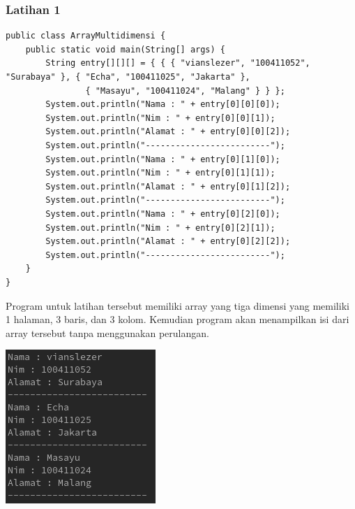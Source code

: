 \documentclass[a4paper,12pt]{article}
\begin{document}
\subsubsection{Latihan 1}
\begin{lstlisting}
public class ArrayMultidimensi {
    public static void main(String[] args) {
        String entry[][][] = { { { "vianslezer", "100411052", "Surabaya" }, { "Echa", "100411025", "Jakarta" },
                { "Masayu", "100411024", "Malang" } } };
        System.out.println("Nama : " + entry[0][0][0]);
        System.out.println("Nim : " + entry[0][0][1]);
        System.out.println("Alamat : " + entry[0][0][2]);
        System.out.println("-------------------------");
        System.out.println("Nama : " + entry[0][1][0]);
        System.out.println("Nim : " + entry[0][1][1]);
        System.out.println("Alamat : " + entry[0][1][2]);
        System.out.println("-------------------------");
        System.out.println("Nama : " + entry[0][2][0]);
        System.out.println("Nim : " + entry[0][2][1]);
        System.out.println("Alamat : " + entry[0][2][2]);
        System.out.println("-------------------------");
    }
}
\end{lstlisting}
Program untuk latihan tersebut memiliki array yang tiga dimensi yang memiliki 1 halaman, 3 baris, dan 3 kolom. Kemudian program akan menampilkan isi dari array
tersebut tanpa menggunakan perulangan.
\begin{center}
    \includegraphics[scale=.8]{4.png}
\end{center}
\end{document}

